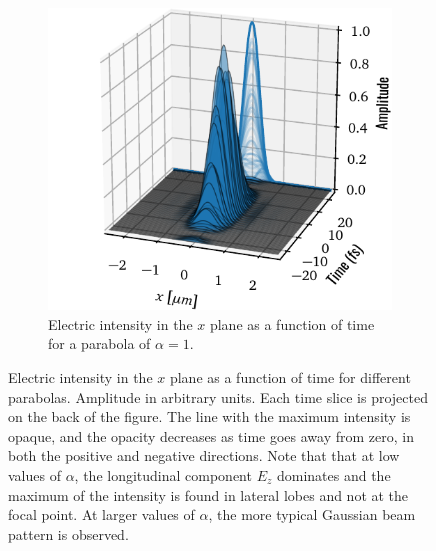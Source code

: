 \documentclass[11pt,SymmetricalJury]{inrsthesis/inrsthesis}
\begin{document}
\begin{figure}
\begin{subfigure}{0.47\textwidth}
      \includegraphics[width=\textwidth]{figs/ElectricIntensityTimeWaterfallf0.04375.pdf}
      \caption{Electric intensity in the $x$ plane as a function of time for a
               parabola of $\alpha=1$.}
      \label{fig:sc.electric_intensity_waterfall43}
    \end{subfigure}
    \caption[Transverse cut of the electric intensity in the focal plane as a function of time, $x$ plane.]
            {Electric intensity in the $x$ plane as a function of time for different parabolas.
            Amplitude in arbitrary units. Each time slice is projected on the back of the figure.
            The line with the maximum intensity is opaque, and the opacity decreases as time
            goes away from zero, in both the positive and negative directions. Note that that at
            low values of $\alpha$, the longitudinal component $E_z$ dominates and the maximum
            of the intensity is found in lateral lobes and not at the focal point. At
            larger values of $\alpha$, the more typical Gaussian beam pattern is observed.}
    \label{fig:sc.electric_intensity_waterfall}
  \end{figure}



\end{document}
